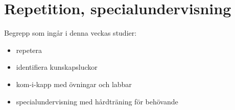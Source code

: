 \chapter{Repetition, specialundervisning}\label{chapter:W08}
Begrepp som ingår i denna veckas studier:
\begin{itemize}[noitemsep,label={$\square$},leftmargin=*]
\item repetera
\item identifiera kunskapsluckor
\item kom-i-kapp med övningar och labbar
\item specialundervisning med hårdträning för behövande\end{itemize}
